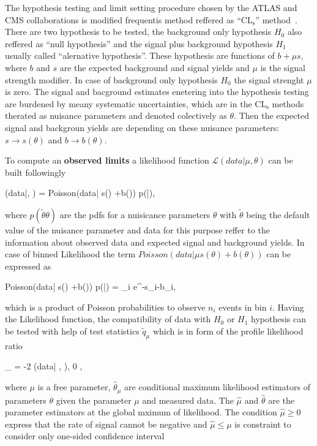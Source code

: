 The hypothesis testing and limit setting procedure chosen by the ATLAS and CMS collaborations is modified frequentis method reffered as ``$\mathrm{CL_{s}}$'' method~\cite{Read:2002hq, Junk:1999kv, Cowan:2010js, CMS-NOTE-2011-005}. There are two hypothesis to be tested, the background only hypothesis $H_{0}$ also reffered as ``null hypothesis'' and the signal plus background hypothesis $H_{1}$ usually called ``alernative hypothesis''. These hypothesis are functions of $b+\mu s$, where $b$ and $s$ are the expected background and signal yields and $\mu$ is the signal strength modifier. In case of background only hypothesis $H_{0}$ the signal strenght $\mu$ is zero. The signal and bacground estimates enetering into the hypothesis testing are burdened by meany systematic uncertainties, which are in the $\mathrm{CL_{s}}$ methods therated as nuisance parameters and denoted colectively as $\theta$. Then the expected signal and backgroun yields are depending on these nuisance parameters: $s \to s(\theta)$ and $b \to b(\theta)$.

To compute an \textbf{observed limits} a likelihood function $\mathcal{L}(data|\mu, \theta)$ can be built followingly

{
(data|\mu, \theta) = Poisson(data| \mu s(\theta) +b(\theta)) p(\tilde{\theta}|\theta),
}

where $p(\tilde{\theta}\theta)$ are the pdfs for a nuisicance parameters $\theta$ with $\tilde{\theta}$ being the default value of the nuisance parameter and data for this purpose reffer to the information about observed data and expected signal and background yields. In case of binned Likelihood the term $Poisson(data| \mu s(\theta) +b(\theta))$ can be expressed as


{
Poisson(data| \mu s(\theta) +b(\theta)) p(\tilde{\theta}|\theta) = \prod_{i}  e^{-\mu s_{i}-b_{i}},
}

which is a product  of Poisson probabilities to observe $n_{i}$ events in bin $i$. Having the Likelihood function, the compatibility of data with $H_{0}$ or $H_{1}$ hypothesis can be tested with help of test statistics $\tilde{q}_{\mu}$ which is in form of the profile likelihood ratio

{
_{\mu} = -2   {(data| \hat{\mu} , \hat{\theta})}, 0 \leq \hat{\mu} \leq \mu ,
}

where $\mu$ is a free parameter, $\hat{\theta}_{\mu}$ are conditional maximum likelihood estimators of parameters $\theta$ given the parameter $\mu$ and measured data. The $\hat{\mu}$ and $\hat{\theta}$ are the parameter estimators at the global mximum of likelihood. The condition $\hat{\mu} \geq 0 $ express that the rate of signal cannot be negative and $\hat{\mu} \leq \mu $ is constraint to consider only one-sided confidence interval 
	  
